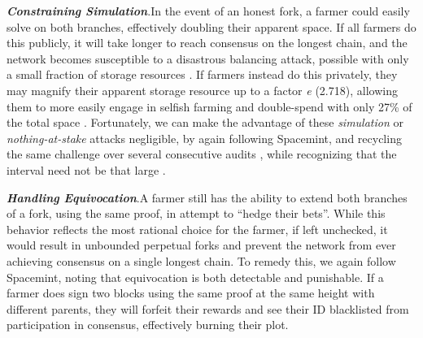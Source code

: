 \documentclass[conference]{IEEEtran}
\begin{document}
\noindent \textbf{\textit{Constraining Simulation}}.\quad In the event of an honest fork, a farmer could easily solve on both branches, effectively doubling their apparent space. If all farmers do this publicly, it will take longer to reach consensus on the longest chain, and the network becomes susceptible to a disastrous balancing attack, possible with only a small fraction of storage resources \cite{wang2019proof}. If farmers instead do this privately, they may magnify their apparent storage resource up to a factor \textit{e} (2.718), allowing them to more easily engage in selfish farming and double-spend with only 27\% of the total space \cite{cohen2019chia}. Fortunately, we can make the advantage of these \textit{simulation} or \textit{nothing-at-stake} attacks negligible, by again following Spacemint, and recycling the same challenge over several consecutive audits \cite{park2018spacemint,kiayias2017ouroboros,wang2019proof}, while recognizing that the interval need not be that large \cite{bagaria2019proof}.

\vspace{2mm}

\noindent \textbf{\textit{Handling Equivocation}}.\quad A farmer still has the ability to extend both branches of a fork, using the same proof, in attempt to “hedge their bets”. While this behavior reflects the most rational choice for the farmer, if left unchecked, it would result in unbounded perpetual forks and prevent the network from ever achieving consensus on a single longest chain. To remedy this, we again follow Spacemint, noting that equivocation is both detectable and punishable. If a farmer does sign two blocks using the same proof at the same height with different parents, they will forfeit their rewards and see their ID blacklisted from participation in consensus, effectively burning their plot.

\vspace{2mm}
\end{document}

